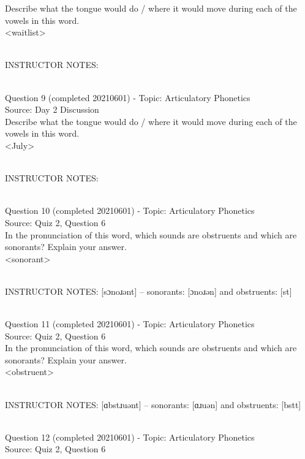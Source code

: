 \documentclass[12pt]{article}
\begin{document}
Describe what the tongue would do / where it would move during each of the vowels in this word.\\

<waitlist>


~\\
INSTRUCTOR NOTES: 


~\\

{\large Question 9} (completed 20210601) - Topic: Articulatory Phonetics\\
Source: Day 2 Discussion\\

Describe what the tongue would do / where it would move during each of the vowels in this word.\\

<July>


~\\
INSTRUCTOR NOTES: 


~\\

{\large Question 10} (completed 20210601) - Topic: Articulatory Phonetics\\
Source: Quiz 2, Question 6\\

In the pronunciation of this word, which sounds are obstruents and which are sonorants? Explain your answer.\\

<sonorant>


~\\
INSTRUCTOR NOTES: [sɔnoɹənt] -- sonorants: [ɔnoɹən] and obstruents: [st]


~\\

{\large Question 11} (completed 20210601) - Topic: Articulatory Phonetics\\
Source: Quiz 2, Question 6\\

In the pronunciation of this word, which sounds are obstruents and which are sonorants? Explain your answer.\\

<obstruent>


~\\
INSTRUCTOR NOTES: [ɑbstɹuənt] -- sonorants: [ɑɹuən] and obstruents: [bstt]


~\\

{\large Question 12} (completed 20210601) - Topic: Articulatory Phonetics\\
Source: Quiz 2, Question 6\\
\end{document}
